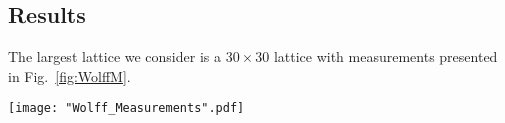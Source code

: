 \documentclass[twocolumn,aps]{revtex4-1} %
\begin{document}
%


\subsection{Results}
The largest lattice we consider is a $30 \times 30$ lattice with measurements presented in Fig.~\ref{fig:WolffM}.
\begin{figure*}
	\texttt{[image: "Wolff\_Measurements".pdf]}
	\caption{\label{fig:WolffM}Plots showing the mean energy per spin, specific heat per spin, mean (absolute) magnetization per spin, magnetic susceptibility on a 30 $\times$ 30 lattice from $T = 1.6$ to $T = 2.9$ in increments of $\Delta T = .01$. 
		Using the Wolff algorithm, the equilibration time at each temperature is 30 steps and each data point is obtained from 150 measurements.}
\end{figure*}
\end{document}

